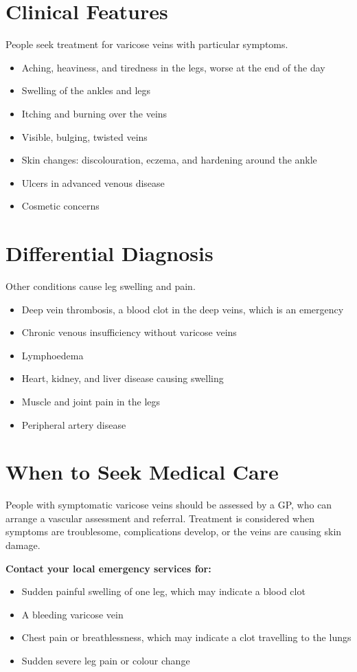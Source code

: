 \section*{Clinical Features}
People seek treatment for varicose veins with particular symptoms.
\begin{itemize}
    \item Aching, heaviness, and tiredness in the legs, worse at the end of the day
    \item Swelling of the ankles and legs
    \item Itching and burning over the veins
    \item Visible, bulging, twisted veins
    \item Skin changes: discolouration, eczema, and hardening around the ankle
    \item Ulcers in advanced venous disease
    \item Cosmetic concerns
\end{itemize}

\section*{Differential Diagnosis}
Other conditions cause leg swelling and pain.
\begin{itemize}
    \item Deep vein thrombosis, a blood clot in the deep veins, which is an emergency
    \item Chronic venous insufficiency without varicose veins
    \item Lymphoedema
    \item Heart, kidney, and liver disease causing swelling
    \item Muscle and joint pain in the legs
    \item Peripheral artery disease
\end{itemize}

\section*{When to Seek Medical Care}
People with symptomatic varicose veins should be assessed by a GP, who can arrange a vascular assessment and referral. Treatment is considered when symptoms are troublesome, complications develop, or the veins are causing skin damage.

\textbf{Contact your local emergency services for:}
\begin{itemize}
    \item Sudden painful swelling of one leg, which may indicate a blood clot
    \item A bleeding varicose vein
    \item Chest pain or breathlessness, which may indicate a clot travelling to the lungs
    \item Sudden severe leg pain or colour change
\end{itemize}

